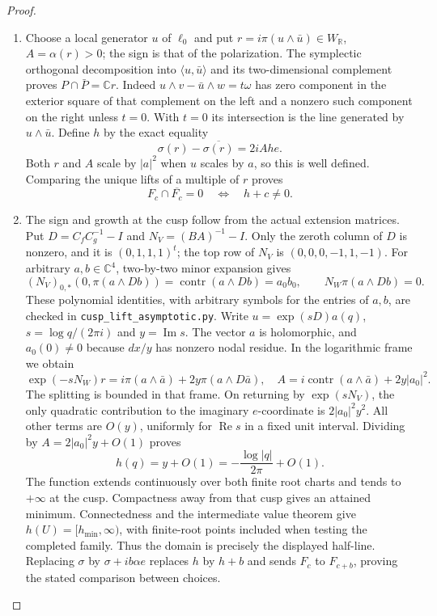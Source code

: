 \begin{proof}
\begin{enumerate}[label=\arabic*.]
\item Choose a local generator $u$ of $\ell_0$ and put
$r=i\pi(u\wedge\bar u)\in W_{\mathbb R}$, $A=\alpha(r)>0$;
the sign is that of the polarization.  The symplectic orthogonal
decomposition into $\langle u,\bar u\rangle$ and its two-dimensional
complement proves $P\cap\bar P=\mathbb Cr$.
Indeed $u\wedge v-\bar u\wedge w=t\omega$ has zero component in the
exterior square of that complement on the left and a nonzero such
component on the right unless $t=0$.  With $t=0$ its intersection is
the line generated by $u\wedge\bar u$.
Define $h$ by the exact equality
\[
\sigma(r)-\overline{\sigma(r)}=2iAh e.
\]
Both $r$ and $A$ scale by $|a|^2$ when $u$ scales by $a$, so this is
well defined.  Comparing the unique lifts of a multiple of $r$ proves
\[
F_c\cap\overline{F_c}=0\quad\Longleftrightarrow\quad h+c\ne0.
\]

\item The sign and growth at the cusp follow from the actual extension
matrices.  Put $D=C_fC_g^{-1}-I$ and $N_V=(BA)^{-1}-I$.
Only the zeroth column of $D$ is nonzero, and it is $(0,1,1,1)^t$;
the top row of $N_V$ is $(0,0,0,-1,1,-1)$.
For arbitrary $a,b\in\mathbb C^4$, two-by-two minor expansion gives
\[
(N_V)_{0,*}(0,\pi(a\wedge Db))
 =\operatorname{contr}(a\wedge Db)=a_0b_0,
 \qquad N_W\pi(a\wedge Db)=0.
\]
These polynomial identities, with arbitrary symbols for the entries of
$a,b$, are checked in \texttt{cusp\_lift\_asymptotic.py}.
Write $u=\exp(sD)a(q)$, $s=\log q/(2\pi i)$ and $y=\operatorname{Im}s$.
The vector $a$ is holomorphic, and $a_0(0)\ne0$ because $dx/y$ has
nonzero nodal residue.  In the logarithmic frame we obtain
\[
\exp(-sN_W)r=i\pi(a\wedge\bar a)+2y\pi(a\wedge D\bar a),
\quad
A=i\operatorname{contr}(a\wedge\bar a)+2y|a_0|^2.
\]
The splitting is bounded in that frame.  On returning by
$\exp(sN_V)$, the only quadratic contribution to the imaginary
$e$-coordinate is $2|a_0|^2y^2$.  All other terms are $O(y)$,
uniformly for $\operatorname{Re}s$ in a fixed unit interval.
Dividing by $A=2|a_0|^2y+O(1)$ proves
\[
h(q)=y+O(1)=-\frac{\log|q|}{2\pi}+O(1).
\]
The function extends continuously over both finite root charts and
tends to $+\infty$ at the cusp.  Compactness away from that cusp gives
an attained minimum.  Connectedness and the intermediate value
theorem give $h(U)=[h_{\min},\infty)$, with finite-root points included
when testing the completed family.  Thus the domain is precisely the
displayed half-line.  Replacing $\sigma$ by $\sigma+ib\alpha e$ replaces
$h$ by $h+b$ and sends $F_c$ to $F_{c+b}$, proving the stated
comparison between choices.


\end{enumerate}
\end{proof}
